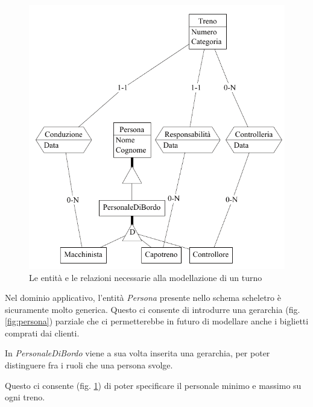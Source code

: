 \documentclass[a4paper,12pt]{report}
\begin{document}
	\begin{figure}[h!]
		\begin{center}
			\includegraphics[scale=.75]{res/schema/turno}
		\end{center}
		\caption{Le entità e le relazioni necessarie alla modellazione di un turno}
		\label{fig:turno}
	\end{figure}
	\par Nel dominio applicativo, l'entità \textit{Persona} presente nello schema scheletro è sicuramente molto generica. Questo ci consente di introdurre una gerarchia (fig. \ref{fig:persona}) parziale che ci permetterebbe in futuro di modellare anche i biglietti comprati dai clienti.
	\par In \textit{PersonaleDiBordo} viene a sua volta inserita una gerarchia, per poter distinguere fra i ruoli che una persona svolge.
	\par Questo ci consente (fig. \ref{fig:turno}) di poter specificare il personale minimo e massimo su ogni treno.
\end{document}
